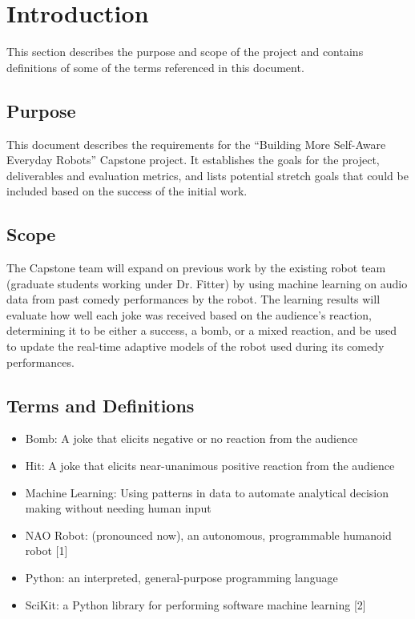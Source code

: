 \documentclass[onecolumn, draftclsnofoot,10pt, compsoc]{IEEEtran}
\begin{document}
\begin{titlepage}
\begin{singlespace}
\begin{abstract}
        \end{abstract}
    \end{singlespace}
\end{titlepage}
\newpage
{}
\tableofcontents
\clearpage

\section{Introduction}
This section describes the purpose and scope of the project and contains definitions of some of the terms referenced in this document.
\subsection{Purpose}
This document describes the requirements for the “Building More Self-Aware Everyday Robots” Capstone project. It establishes the goals for the project, deliverables and evaluation metrics, and lists potential stretch goals that could be included based on the success of the initial work.
\subsection{Scope}
The Capstone team will expand on previous work by the existing robot team (graduate students working under Dr. Fitter) by using machine learning on audio data from past comedy performances by the robot. The learning results will evaluate how well each joke was received based on the audience's reaction, determining it to be either a success, a bomb, or a mixed reaction, and be used to update the real-time adaptive models of the robot used during its comedy performances.
\subsection{Terms and Definitions}
\begin{itemize}	
\item Bomb: A joke that elicits negative or no reaction from the audience
\item Hit: A joke that elicits near-unanimous positive reaction from the audience
\item Machine Learning: Using patterns in data to automate analytical decision making without needing human input
\item NAO Robot: (pronounced now), an autonomous, programmable humanoid robot [1]
\item Python: an interpreted, general-purpose programming language
\item SciKit: a Python library for performing software machine learning [2]
\end{itemize}
\end{document}
